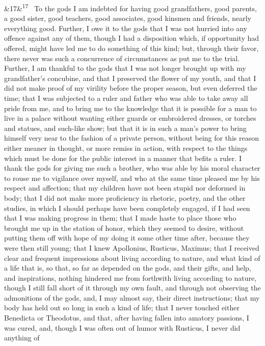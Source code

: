 \documentclass[12pt]{article}
\newcommand{\para}[1][]{\par\noindent\ifx&#1&\else\textsuperscript{\footnotesize #1}~\fi}
\begin{document}
\para[17] To the gods I am indebted for having good grandfathers, good
parents, a good sister, good teachers, good associates, good kinsmen and
friends, nearly everything good. Further, I owe it to the gods that I
was not hurried into any offence against any of them, though I had a
disposition which, if opportunity had offered, might have led me to do
something of this kind; but, through their favor, there never was such a
concurrence of circumstances as put me to the trial. Further, I am
thankful to the gods that I was not longer brought up with my
grandfather's concubine, and that I preserved the flower of my youth,
and that I did not make proof of my virility before the proper season,
but even deferred the time; that I was subjected to a ruler and father
who was able to take away all pride from me, and to bring me to the
knowledge that it is possible for a man to live in a palace without
wanting either guards or embroidered dresses, or torches and statues,
and such-like show; but that it is in such a man's power to bring
himself very near to the fashion of a private person, without being for
this reason either meaner in thought, or more remiss in action, with
respect to the things which must be done for the public interest in a
manner that befits a ruler. I thank the gods for giving me such a
brother, who was able by his moral character to rouse me to vigilance
over myself, and who at the same time pleased me by his respect and
affection; that my children have not been stupid nor deformed in body;
that I did not make more proficiency in rhetoric, poetry, and the other
studies, in which I should perhaps have been completely engaged, if I
had seen that I was making progress in them; that I made haste to place
those who brought me up in the station of honor, which they seemed to
desire, without putting them off with hope of my doing it some other
time after, because they were then still young; that I knew Apollonius,
Rusticus, Maximus; that I received clear and frequent impressions about
living according to nature, and what kind of a life that is, so that, so
far as depended on the gods, and their gifts, and help, and
inspirations, nothing hindered me from forthwith living according to
nature, though I still fall short of it through my own fault, and
through not observing the admonitions of the gods, and, I may almost
say, their direct instructions; that my body has held out so long in
such a kind of life; that I never touched either Benedicta or Theodotus,
and that, after having fallen into amatory passions, I was cured, and,
though I was often out of humor with Rusticus, I never did anything of
\end{document}
